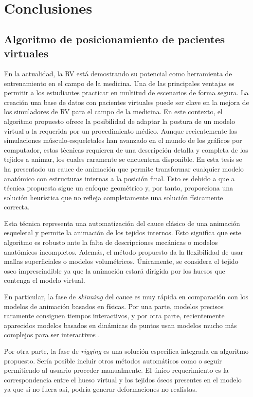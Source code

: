 \chapter{Conclusiones}
\label{cap:conclu}

\section{Algoritmo de posicionamiento de pacientes virtuales}
\label{conclu:posing}
En la actualidad, la \ac{RV} está demostrando su potencial como herramienta de entrenamiento en el campo de la medicina.  Una de las principales ventajas es permitir a los estudiantes practicar en multitud de escenarios de forma segura. La creación una base de datos con pacientes virtuales puede ser clave en la mejora de los simuladores de \ac{RV} para el campo de la medicina. En este contexto, el algoritmo propuesto ofrece la posibilidad de adaptar la postura de un modelo virtual a la requerida por un procedimiento médico. Aunque recientemente las simulaciones músculo-esqueletales han avanzado en el mundo de los gráficos por computador, estas técnicas requieren de una descripción detalla y completa de los tejidos a animar, los cuales raramente se encuentran disponible. En esta tesis se ha presentado un cauce de animación que permite transformar cualquier modelo anatómico con estructuras internas a la posición final. Esto es debido a que a técnica propuesta sigue un enfoque geométrico y, por tanto, proporciona una solución heurística que no refleja completamente una solución físicamente correcta.

Esta técnica representa una automatización del cauce clásico de una animación esqueletal y permite la animación de los tejidos internos. Esto significa que este algoritmo es robusto ante la falta de descripciones mecánicas o modelos anatómicos incompletos. Además, el método propuesto da la flexibilidad de usar mallas superficiales o modelos volumétricos. Únicamente, se considera el tejido oseo imprescindible ya que la animación estará dirigida por los huesos que contenga el modelo virtual.

En particular, la fase de \emph{skinning} del cauce es muy rápida en comparación con los modelos de animación basados en físicas. Por una parte, modelos precisos raramente consiguen tiempos interactivos, y por otra parte, recientemente aparecidos modelos basados en dinámicas de puntos usan modelos mucho más complejos para ser interactivos  \cite{abu2015position}.

Por otra parte, la fase de \emph{rigging} es una solución especifica integrada en algoritmo propuesto. Sería posible incluir otros métodos automáticos como \cite{Baran2007} o seguir permitiendo al usuario proceder manualmente. El único requerimiento es la correspondencia entre el hueso virtual y los tejidos óseos presentes en el modelo ya que si no fuera así, podría generar deformaciones no realistas.

